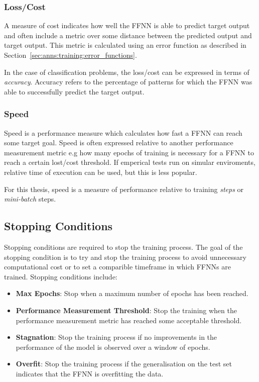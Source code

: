 \subsubsection{Loss/Cost}
\label{sec:anns:training:performance_measure:loss_cost}

A measure of cost indicates how well the \ac{FFNN} is able to predict target
output and often include a metric over some distance between the predicted
output and target output. This metric is calculated using an error function as
described in Section~\ref{sec:anns:training:error_functions}.

In the case of classification problems, the loss/cost can be expressed in terms
of \textit{accuracy}. Accuracy refers to the percentage of patterns for which
the \ac{FFNN} was able to successfully predict the target output. 

\subsubsection{Speed}
\label{sec:anns:training:performance_measure:speed}

Speed is a performance measure which calculates how fast a \ac{FFNN} can reach
some target goal. Speed is often expressed relative to another performance
measurement metric e.g how many epochs of training is necessary for a \ac{FFNN}
to reach a certain lost/cost threshold. If emperical tests run on simular
enviroments, relative time of execution can be used, but this is less popular.

For this thesis, speed is a measure of performance relative to training
\textit{steps} or \textit{mini-batch} steps.


\subsection{Stopping Conditions}
\label{sec:anns:training:stopping_conditions}

Stopping conditions are required to stop the training process. The goal of the
stopping condition is to try and stop the training process to avoid unnecessary
computational cost or to set a comparible timeframe in which \acp{FFNN} are
trained. Stopping conditions include:

\begin{itemize}
    \item
    \textbf{Max Epochs}: Stop when a maximum number of epochs has been reached.

    \item
    \textbf{Performance Measurement Threshold}: Stop the training when the
    performance measurement metric has reached some acceptable threshold.

    \item
    \textbf{Stagnation}: Stop the training process if no improvements in the
    performance of the model is observed over a window of epochs.

    \item
    \textbf{Overfit}: Stop the training process if the generalisation on the
    test set indicates that the \ac{FFNN} is overfitting the data.
\end{itemize}


